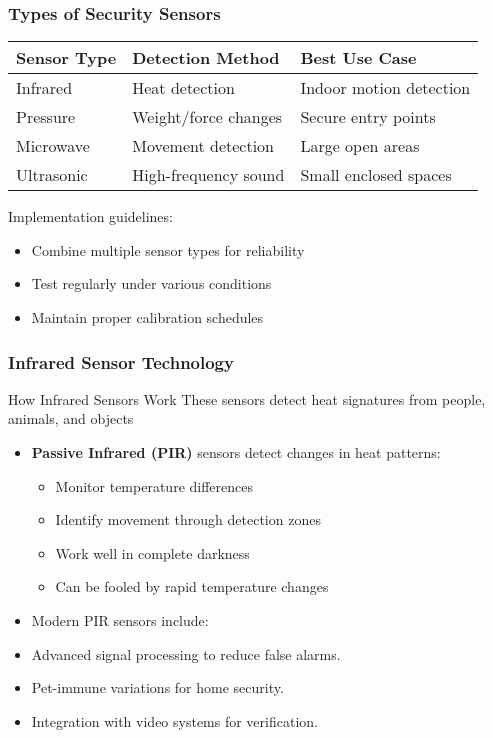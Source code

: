 \documentclass{beamer}
\begin{document}
\begin{frame}
    \frametitle{Types of Security Sensors}
    \begin{table}
        \begin{tabular}{|p{}|p{}|p{}|}
            \hline
            \textbf{Sensor Type} & \textbf{Detection Method} & \textbf{Best Use Case} \\
            \hline
            Infrared & Heat detection & Indoor motion detection \\
            \hline
            Pressure & Weight/force changes & Secure entry points \\
            \hline
            Microwave & Movement detection & Large open areas \\
            \hline
            Ultrasonic & High-frequency sound & Small enclosed spaces \\
            \hline
        \end{tabular}
    \end{table}
    
    Implementation guidelines:
    \begin{itemize}
        \item Combine multiple sensor types for reliability
        \item Test regularly under various conditions
        \item Maintain proper calibration schedules
    \end{itemize}
\end{frame}

\begin{frame}
    \frametitle{Infrared Sensor Technology}
    \begin{block}{How Infrared Sensors Work}
        These sensors detect heat signatures from people, animals, and objects
    \end{block}
    \begin{itemize}
        \item \textbf{Passive Infrared (PIR)} sensors detect changes in heat patterns:
            \begin{itemize}
                \item Monitor temperature differences
                \item Identify movement through detection zones
                \item Work well in complete darkness
                \item Can be fooled by rapid temperature changes
            \end{itemize}
        \item Modern PIR sensors include:
        \item Advanced signal processing to reduce false alarms.
        \item Pet-immune variations for home security.
        \item Integration with video systems for verification.
    \end{itemize}
\end{frame}
\end{document}
